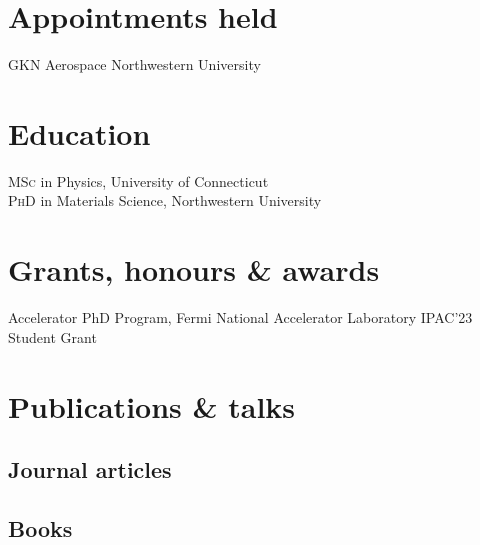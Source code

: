 \documentclass[11pt]{article} %
\begin{document}
\section*{Appointments held}

GKN Aerospace
Northwestern University


\section*{Education}

\textsc{MSc} in Physics, University of Connecticut\\
\textsc{PhD} in Materials Science, Northwestern University


\section*{Grants, honours \& awards}

Accelerator PhD Program, Fermi National Accelerator Laboratory
IPAC'23 Student Grant


\section*{Publications \& talks}

\subsection*{Journal articles}




\subsection*{Books}
\end{document}
